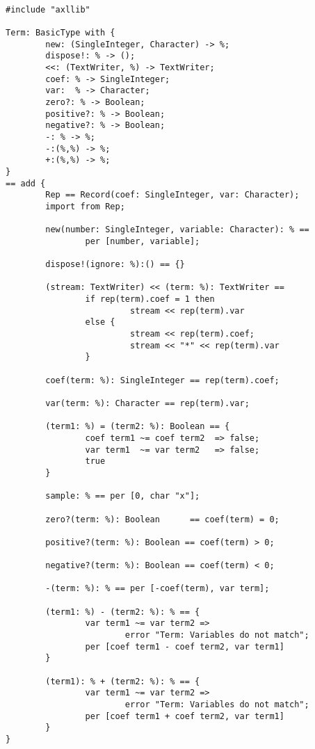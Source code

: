 \begin{small}
\begin{verbatim}

#include "axllib"

Term: BasicType with {
        new: (SingleInteger, Character) -> %;
        dispose!: % -> ();
        <<: (TextWriter, %) -> TextWriter;
        coef: % -> SingleInteger;
        var:  % -> Character;
        zero?: % -> Boolean;
        positive?: % -> Boolean;
        negative?: % -> Boolean;
        -: % -> %;
        -:(%,%) -> %;
        +:(%,%) -> %;
}
== add {
        Rep == Record(coef: SingleInteger, var: Character);
        import from Rep;

        new(number: SingleInteger, variable: Character): % == 
                per [number, variable];

        dispose!(ignore: %):() == {}

        (stream: TextWriter) << (term: %): TextWriter == 
                if rep(term).coef = 1 then
                         stream << rep(term).var
                else {
                         stream << rep(term).coef;
                         stream << "*" << rep(term).var
                }

        coef(term: %): SingleInteger == rep(term).coef;

        var(term: %): Character == rep(term).var;

        (term1: %) = (term2: %): Boolean == {
                coef term1 ~= coef term2  => false;
                var term1  ~= var term2   => false;
                true
        }

        sample: % == per [0, char "x"];

        zero?(term: %): Boolean      == coef(term) = 0;

        positive?(term: %): Boolean == coef(term) > 0;

        negative?(term: %): Boolean == coef(term) < 0;

        -(term: %): % == per [-coef(term), var term];

        (term1: %) - (term2: %): % == {
                var term1 ~= var term2 => 
                        error "Term: Variables do not match";
                per [coef term1 - coef term2, var term1]
        }

        (term1): % + (term2: %): % == {
                var term1 ~= var term2 => 
                        error "Term: Variables do not match";
                per [coef term1 + coef term2, var term1]
        }
}


\end{verbatim}
\end{small}
